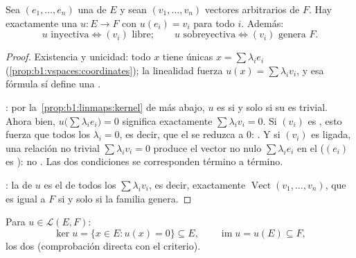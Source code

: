 \begin{proposition}\label{prop:b1:linmaps:basis}
Sea $(e_1, \dots, e_n)$ una  de $E$ y sean $(v_1, \dots, v_n)$
vectores arbitrarios de $F$. Hay exactamente una 
$u \colon E \to F$ con $u(e_i) = v_i$ para todo $i$. Además:
\[
u \text{ inyectiva} \iff (v_i) \text{ libre};
\qquad
u \text{ sobreyectiva} \iff (v_i) \text{ genera } F .
\]
\end{proposition}

\begin{proof}
Existencia y unicidad: todo $x$ tiene  únicas
$x = \sum \lambda_i e_i$ (\cref{prop:b1:vspaces:coordinates}); la
linealidad fuerza $u(x) = \sum \lambda_i v_i$, y esa fórmula sí
define una .

: por la~\cref{prop:b1:linmaps:kernel} de más abajo, $u$
es  si y solo si su  es trivial. Ahora bien,
$u\bigl(\sum\lambda_i e_i\bigr) = 0$ significa exactamente
$\sum\lambda_i v_i = 0$. Si $(v_i)$ es , esto fuerza que todos
los $\lambda_i = 0$, es decir, que el  se reduzca a $0$:
. Y si $(v_i)$ es ligada, una relación no trivial
$\sum\lambda_i v_i = 0$ produce el vector no nulo
$\sum\lambda_i e_i$ en el  ($(e_i)$ es ): no .
Las dos condiciones se corresponden término a término.

: la  de $u$ es el  de todos los
$\sum\lambda_i v_i$, es decir, exactamente
$\operatorname{Vect}(v_1, \dots, v_n)$, que es igual a $F$ si y solo
si la familia genera.
\end{proof}

\begin{definition}\label{def:b1:linmaps:kerim}
Para $u \in \mathcal{L}(E, F)$:
\[
\ker u = \{x \in E : u(x) = 0\} \subseteq E,
\qquad
\operatorname{im} u = u(E) \subseteq F ,
\]
los dos  (comprobación directa con el
criterio).
\end{definition}

